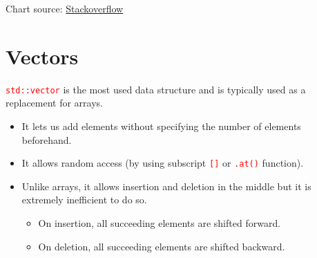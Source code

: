 \documentclass[12pt]{article}
\begin{document}
\newpage
\begin{table}[H]
\end{table}
\newpage

\noindent Chart source: \href{https://stackoverflow.com/questions/471432/in-which-scenario-do-i-use-a-particular-stl-container}{Stackoverflow}

\section*{Vectors}

\noindent \textcolor{red}{\texttt{std::vector}} is the most used data structure and is typically used as a replacement for arrays.

\begin{itemize}
    \item It lets us add elements without specifying the number of elements beforehand. 
    \item It allows random access (by using subscript \textcolor{red}{\texttt{[]}} or \textcolor{red}{\texttt{.at()}} function).
    \item Unlike arrays, it allows insertion and deletion in the middle but it is extremely inefficient to do so.
    \begin{itemize}
        \item On insertion, all succeeding elements are shifted forward.
        \item On deletion, all succeeding elements are shifted backward.
    \end{itemize}
\end{itemize}
\end{document}
